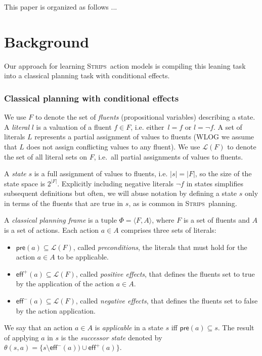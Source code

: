 \documentclass{article}
\newcommand{\tup}[1]{{\langle #1 \rangle}}
\newcommand{\pre}{\mathsf{pre}}     %
\newcommand{\eff}{\mathsf{eff}}     %
\newcommand{\strips}{\textsc{Strips}}     %
\begin{document}
This paper is organized as follows ...


\section{Background}
Our approach for learning \strips\ action models is compiling this leaning task into a classical planning task with conditional effects.

\subsubsection{Classical planning with conditional effects}
We use $F$ to denote the set of {\em fluents} (propositional variables) describing a state. A {\em literal} $l$ is a valuation of a fluent $f\in F$, i.e. either~$l=f$ or $l=\neg f$. A set of literals $L$ represents a partial assignment of values to fluents (WLOG we assume that $L$ does not assign conflicting values to any fluent). We use $\mathcal{L}(F)$ to denote the set of all literal sets on $F$, i.e.~all partial assignments of values to fluents.

A {\em state} $s$ is a full assignment of values to fluents, i.e. $|s|=|F|$, so the size of the state space is $2^{|F|}$. Explicitly including negative literals $\neg f$ in states simplifies subsequent definitions but often, we will abuse notation by defining a state $s$ only in terms of the fluents that are true in $s$, as is common in \strips\ planning.

A {\em classical planning frame} is a tuple $\Phi=\tup{F,A}$, where $F$ is a set of fluents and $A$ is a set of actions. Each action $a\in A$ comprises three sets of literals:
\begin{itemize}
\item $\pre(a)\subseteq\mathcal{L}(F)$, called {\em preconditions}, the literals that must hold for the action $a\in A$ to be applicable.
\item $\eff^+(a)\subseteq\mathcal{L}(F)$, called {\em positive effects}, that defines the fluents set to true by the application of the action $a\in A$.
\item $\eff^-(a)\subseteq\mathcal{L}(F)$, called {\em negative effects}, that defines the fluents set to false by the action application.
\end{itemize}
We say that an action $a\in A$ is {\em applicable} in a state $s$ iff $\pre(a)\subseteq s$. The result of applying $a$ in $s$ is the {\em successor state} denoted by $\theta(s,a)=\{s\setminus\eff^-(a))\cup\eff^+(a)\}$.
\end{document}
